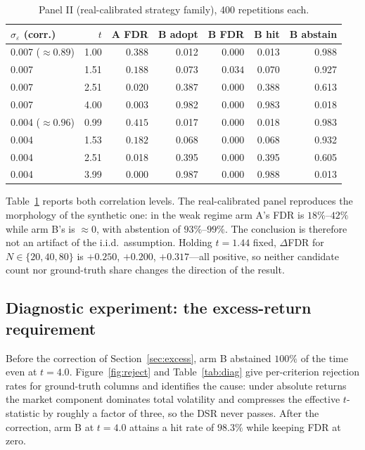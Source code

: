 \documentclass[11pt]{article}
\begin{document}
\begin{table}[htbp]
\centering
\caption{Panel II (real-calibrated strategy family), 400 repetitions each.}
\label{tab:exp2}
\small
\begin{tabular}{@{}lrrrrrr@{}}
\toprule
$\sigma_\varepsilon$ (corr.) & $t$ & \textbf{A FDR} & B adopt & \textbf{B FDR} & B hit & B abstain \\
\midrule
0.007 ($\approx0.89$) & 1.00 & $\mathbf{0.388}$ & 0.012 & $\mathbf{0.000}$ & 0.013 & 0.988 \\
0.007 & 1.51 & $\mathbf{0.188}$ & 0.073 & $\mathbf{0.034}$ & 0.070 & 0.927 \\
0.007 & 2.51 & 0.020 & 0.387 & $\mathbf{0.000}$ & 0.388 & 0.613 \\
0.007 & 4.00 & 0.003 & 0.982 & $\mathbf{0.000}$ & 0.983 & 0.018 \\
\midrule
0.004 ($\approx0.96$) & 0.99 & $\mathbf{0.415}$ & 0.017 & $\mathbf{0.000}$ & 0.018 & 0.983 \\
0.004 & 1.53 & $\mathbf{0.182}$ & 0.068 & $\mathbf{0.000}$ & 0.068 & 0.932 \\
0.004 & 2.51 & 0.018 & 0.395 & $\mathbf{0.000}$ & 0.395 & 0.605 \\
0.004 & 3.99 & 0.000 & 0.987 & $\mathbf{0.000}$ & 0.988 & 0.013 \\
\bottomrule
\end{tabular}
\end{table}

Table~\ref{tab:exp2} reports both correlation levels. The real-calibrated panel reproduces the
morphology of the synthetic one: in the weak regime arm A's FDR is $18\%$--$42\%$ while arm B's
is $\approx0$, with abstention of $93\%$--$99\%$. The conclusion is therefore not an artifact of
the i.i.d.\ assumption. Holding $t=1.44$ fixed, $\Delta$FDR for $N\in\{20,40,80\}$ is $+0.250$,
$+0.200$, $+0.317$---all positive, so neither candidate count nor ground-truth share changes the
direction of the result.

\subsection{Diagnostic experiment: the excess-return requirement}
\label{sec:diag}

Before the correction of Section~\ref{sec:excess}, arm B abstained $100\%$ of the time even at
$t=4.0$. Figure~\ref{fig:reject} and Table~\ref{tab:diag} give per-criterion rejection rates for ground-truth columns and
identifies the cause: under absolute returns the market component dominates total volatility and
compresses the effective $t$-statistic by roughly a factor of three, so the DSR never passes.
After the correction, arm B at $t=4.0$ attains a hit rate of $98.3\%$ while keeping FDR at zero.
\end{document}

